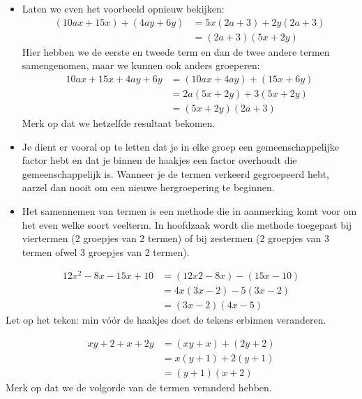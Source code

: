 \documentclass{bis}
\begin{document}
\begin{itemize}
  \item Laten we even het voorbeeld opnieuw bekijken:
  \begin{align*}
    (10ax + 15x) + (4ay + 6y)	&= 5x (2a + 3) + 2y (2a + 3)\\
		                          &= (2a + 3) (5x + 2y)
  \end{align*}
  Hier hebben we de eerste en tweede term en dan de twee andere termen samengenomen, maar we kunnen ook anders groeperen:
  \begin{align*}
  10ax + 15x + 4ay + 6y	&= (10ax + 4ay) + (15x + 6y)\\
                        &= 2a (5x + 2y) + 3 (5x + 2y)\\
                        &= (5x + 2y) (2a + 3)
  \end{align*}
  Merk op dat we hetzelfde resultaat bekomen.
  \item Je dient er vooral op te letten dat je in elke groep een gemeenschappelijke factor hebt en dat je binnen de haakjes een factor overhoudt die gemeenschappelijk is. Wanneer je de termen verkeerd gegroepeerd hebt, aarzel dan nooit om een nieuwe hergroepering te beginnen.
  \item Het samennemen van termen is een methode die in aanmerking komt voor om het even welke soort veelterm. In hoofdzaak wordt die methode toegepast bij viertermen (2 groepjes van 2 termen) of bij zestermen (2 groepjes van 3 termen ofwel 3 groepjes van 2 termen).
\end{itemize}

\begin{voorbeeld}
\begin{align*}
12x^2 - 8x - 15x + 10	&= (12x2 - 8x) - (15x - 10)\\
                      &= 4x (3x - 2) - 5 (3x - 2)\\
                      &= (3x - 2) (4x - 5)
\end{align*}
Let op het teken: min vóór de haakjes doet de tekens erbinnen veranderen.
\end{voorbeeld}

\begin{voorbeeld}
\begin{align*}
xy + 2 + x + 2y	&= (xy + x) + (2y + 2)\\
                &= x (y + 1) + 2 (y + 1)\\
                &= (y + 1) (x + 2)
\end{align*}
Merk op dat we de volgorde van de termen veranderd hebben.
\end{voorbeeld}
\end{document}
